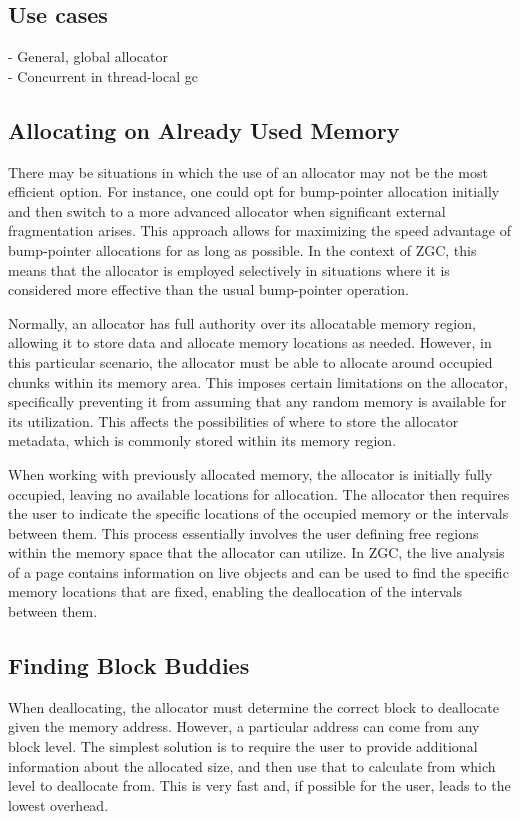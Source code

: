 \subsection{Use cases}

- General, global allocator \\
- Concurrent in thread-local gc

\subsection{Allocating on Already Used Memory} \label{sec:freerangeexpl}
There may be situations in which the use of an allocator may not be the most efficient option. For instance, one could opt for bump-pointer allocation initially and then switch to a more advanced allocator when significant external fragmentation arises. This approach allows for maximizing the speed advantage of bump-pointer allocations for as long as possible. In the context of ZGC, this means that the allocator is employed selectively in situations where it is considered more effective than the usual bump-pointer operation.

Normally, an allocator has full authority over its allocatable memory region, allowing it to store data and allocate memory locations as needed. However, in this particular scenario, the allocator must be able to allocate around occupied chunks within its memory area. This imposes certain limitations on the allocator, specifically preventing it from assuming that any random memory is available for its utilization. This affects the possibilities of where to store the allocator metadata, which is commonly stored within its memory region.

When working with previously allocated memory, the allocator is initially fully occupied, leaving no available locations for allocation. The allocator then requires the user to indicate the specific locations of the occupied memory or the intervals between them. This process essentially involves the user defining free regions within the memory space that the allocator can utilize. In ZGC, the live analysis of a page contains information on live objects and can be used to find the specific memory locations that are fixed, enabling the deallocation of the intervals between them.

\subsection{Finding Block Buddies} \label{sec:findbuddiesexpl}
When deallocating, the allocator must determine the correct block to deallocate given the memory address. However, a particular address can come from any block level. The simplest solution is to require the user to provide additional information about the allocated size, and then use that to calculate from which level to deallocate from. This is very fast and, if possible for the user, leads to the lowest overhead.

